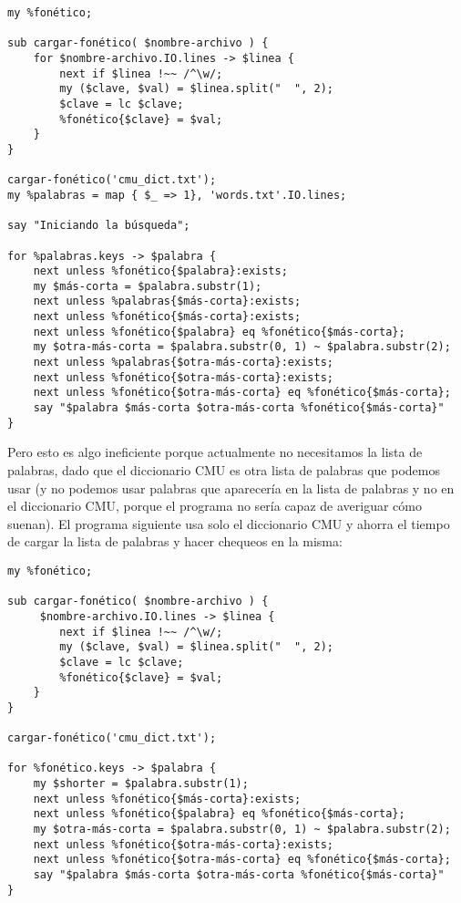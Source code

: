 \begin{verbatim}
my %fonético;

sub cargar-fonético( $nombre-archivo ) {
    for $nombre-archivo.IO.lines -> $linea {
        next if $linea !~~ /^\w/; 
        my ($clave, $val) = $linea.split("  ", 2);
        $clave = lc $clave;
        %fonético{$clave} = $val;
    }
}

cargar-fonético('cmu_dict.txt');
my %palabras = map { $_ => 1}, 'words.txt'.IO.lines;

say "Iniciando la búsqueda";

for %palabras.keys -> $palabra {
    next unless %fonético{$palabra}:exists;
    my $más-corta = $palabra.substr(1);
    next unless %palabras{$más-corta}:exists;
    next unless %fonético{$más-corta}:exists;
    next unless %fonético{$palabra} eq %fonético{$más-corta};
    my $otra-más-corta = $palabra.substr(0, 1) ~ $palabra.substr(2);
    next unless %palabras{$otra-más-corta}:exists;
    next unless %fonético{$otra-más-corta}:exists;
    next unless %fonético{$otra-más-corta} eq %fonético{$más-corta};
    say "$palabra $más-corta $otra-más-corta %fonético{$más-corta}"
}
\end{verbatim}

Pero esto es algo ineficiente porque actualmente no
necesitamos la lista de palabras, dado que el 
diccionario CMU es otra lista de palabras que podemos
usar (y no podemos usar palabras que aparecería en la
lista de palabras y no en el diccionario CMU, porque el
programa no sería capaz de averiguar cómo suenan). El
programa siguiente usa solo el diccionario CMU
y ahorra el tiempo de cargar la lista de palabras y
hacer chequeos en la misma:

\begin{verbatim}
my %fonético;

sub cargar-fonético( $nombre-archivo ) {
     $nombre-archivo.IO.lines -> $linea {
        next if $linea !~~ /^\w/; 
        my ($clave, $val) = $linea.split("  ", 2);
        $clave = lc $clave;
        %fonético{$clave} = $val;
    }
}

cargar-fonético('cmu_dict.txt');

for %fonético.keys -> $palabra {
    my $shorter = $palabra.substr(1);
    next unless %fonético{$más-corta}:exists;
    next unless %fonético{$palabra} eq %fonético{$más-corta};
    my $otra-más-corta = $palabra.substr(0, 1) ~ $palabra.substr(2);
    next unless %fonético{$otra-más-corta}:exists;
    next unless %fonético{$otra-más-corta} eq %fonético{$más-corta};
    say "$palabra $más-corta $otra-más-corta %fonético{$más-corta}"
}
\end{verbatim}



